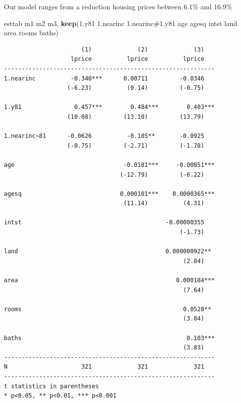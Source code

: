 \documentclass[
]{book}
\newenvironment{Shaded}{\begin{snugshade}}{\end{snugshade}}
\newcommand{\KeywordTok}[1]{\textcolor[rgb]{0.13,0.29,0.53}{\textbf{#1}}}
\newcommand{\NormalTok}[1]{#1}
\begin{document}
Our model ranges from a reduction housing prices between 6.1\% and 16.9\%

\begin{Shaded}
\begin{Highlighting}[]
\NormalTok{    esttab m1 m2 m3, }\KeywordTok{keep}\NormalTok{(1.y81 1.nearinc 1.nearinc\#1.y81 age agesq intst land area rooms baths)}
\end{Highlighting}
\end{Shaded}

\begin{verbatim}
                      (1)             (2)             (3)   
                   lprice          lprice          lprice   
------------------------------------------------------------
1.nearinc          -0.340***      0.00711         -0.0346   
                  (-6.23)          (0.14)         (-0.75)   

1.y81               0.457***        0.484***        0.403***
                  (10.08)         (13.10)         (13.79)   

1.nearinc~81      -0.0626          -0.185**       -0.0925   
                  (-0.75)         (-2.71)         (-1.78)   

age                               -0.0181***     -0.00851***
                                 (-12.79)         (-6.22)   

agesq                            0.000101***    0.0000365***
                                  (11.14)          (4.31)   

intst                                         -0.00000355   
                                                  (-1.73)   

land                                          0.000000922** 
                                                   (2.84)   

area                                             0.000184***
                                                   (7.64)   

rooms                                              0.0528** 
                                                   (3.04)   

baths                                               0.103***
                                                   (3.83)   
------------------------------------------------------------
N                     321             321             321   
------------------------------------------------------------
t statistics in parentheses
* p<0.05, ** p<0.01, *** p<0.001
\end{verbatim}
\end{document}

